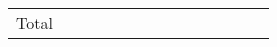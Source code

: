 \begin{paperTable}
\begin{tabularx}{\linewidth}{|s|*{6}{CC|}t|}
        \papers{}         &                &                &                &                &                 &                &  &  &  &  &  &  &  \\
        \hline
        Total             &                &                &                &                &                 &                &  &  &  &  &  &  &  \\
        \hline
    \end{tabularx}
\end{paperTable}